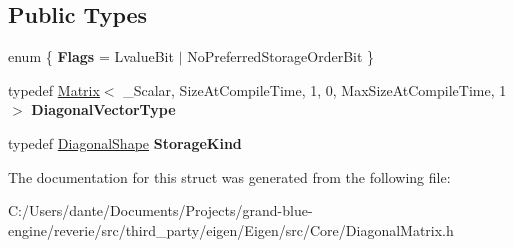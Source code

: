 \subsection*{Public Types}
\begin{DoxyCompactItemize}
\item 
\mbox{\label{struct_eigen_1_1internal_1_1traits_3_01_diagonal_matrix_3_01___scalar_00_01_size_at_compile_timeb0b2868b66e3b20cd28c00acb4409967_a3268d31d3fcf21b72eceea9731e071a0}} 
enum \{ {\bfseries Flags} = Lvalue\+Bit $\vert$ No\+Preferred\+Storage\+Order\+Bit
 \}
\item 
\mbox{\label{struct_eigen_1_1internal_1_1traits_3_01_diagonal_matrix_3_01___scalar_00_01_size_at_compile_timeb0b2868b66e3b20cd28c00acb4409967_a27513ae71017b40bf3c27b5fcebff7f1}} 
typedef \mbox{\hyperlink{class_eigen_1_1_matrix}{Matrix}}$<$ \+\_\+\+Scalar, Size\+At\+Compile\+Time, 1, 0, Max\+Size\+At\+Compile\+Time, 1 $>$ {\bfseries Diagonal\+Vector\+Type}
\item 
\mbox{\label{struct_eigen_1_1internal_1_1traits_3_01_diagonal_matrix_3_01___scalar_00_01_size_at_compile_timeb0b2868b66e3b20cd28c00acb4409967_a2225b46d111387e4395222c9ad6dccdc}} 
typedef \mbox{\hyperlink{struct_eigen_1_1_diagonal_shape}{Diagonal\+Shape}} {\bfseries Storage\+Kind}
\end{DoxyCompactItemize}


The documentation for this struct was generated from the following file\+:\begin{DoxyCompactItemize}
\item 
C\+:/\+Users/dante/\+Documents/\+Projects/grand-\/blue-\/engine/reverie/src/third\+\_\+party/eigen/\+Eigen/src/\+Core/Diagonal\+Matrix.\+h\end{DoxyCompactItemize}
